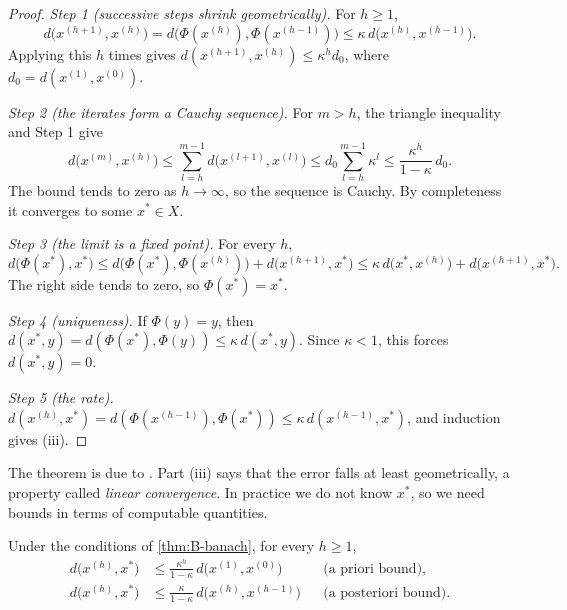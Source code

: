 \begin{proof}
\emph{Step 1 (successive steps shrink geometrically).} For $h \geq 1$,
\begin{equation*}
  d\big(x^{(h+1)}, x^{(h)}\big) = d\big(\Phi(x^{(h)}), \Phi(x^{(h-1)})\big) \leq \kappa\,d\big(x^{(h)},
  x^{(h-1)}\big).
\end{equation*}
Applying this $h$ times gives $d(x^{(h+1)}, x^{(h)}) \leq \kappa^h d_0$, where $d_0 = d(x^{(1)}, x^{(0)})$.

\emph{Step 2 (the iterates form a Cauchy sequence).} For $m > h$, the triangle inequality and Step 1 give
\begin{equation*}
  d\big(x^{(m)}, x^{(h)}\big) \leq \sum_{l=h}^{m-1}d\big(x^{(l+1)}, x^{(l)}\big) \leq d_0\sum_{l=h}^{m-1}
  \kappa^l \leq \frac{\kappa^h}{1 - \kappa}\,d_0.
\end{equation*}
The bound tends to zero as $h \to \infty$, so the sequence is Cauchy. By completeness it converges to some
$x^* \in X$.

\emph{Step 3 (the limit is a fixed point).} For every $h$,
\begin{equation*}
  d\big(\Phi(x^*), x^*\big) \leq d\big(\Phi(x^*), \Phi(x^{(h)})\big) + d\big(x^{(h+1)}, x^*\big)
  \leq \kappa\,d\big(x^*, x^{(h)}\big) + d\big(x^{(h+1)}, x^*\big).
\end{equation*}
The right side tends to zero, so $\Phi(x^*) = x^*$.

\emph{Step 4 (uniqueness).} If $\Phi(y) = y$, then $d(x^*, y) = d(\Phi(x^*), \Phi(y)) \leq \kappa\,d(x^*, y)$.
Since $\kappa < 1$, this forces $d(x^*, y) = 0$.

\emph{Step 5 (the rate).} $d(x^{(h)}, x^*) = d(\Phi(x^{(h-1)}), \Phi(x^*)) \leq \kappa\,d(x^{(h-1)}, x^*)$, and
induction gives (iii).
\end{proof}

The theorem is due to \citet{Banach1922}. Part (iii) says that the error falls at least geometrically, a
property called \emph{linear convergence}. In practice we do not know $x^*$, so we need bounds in terms of
computable quantities.

\begin{corollary}\label{cor:B-banach-bounds}
Under the conditions of \cref{thm:B-banach}, for every $h \geq 1$,
\begin{align}
  d\big(x^{(h)}, x^*\big) &\leq \frac{\kappa^h}{1 - \kappa}\,d\big(x^{(1)}, x^{(0)}\big)
  && \text{(a priori bound)}, \label{eq:B-apriori}\\
  d\big(x^{(h)}, x^*\big) &\leq \frac{\kappa}{1 - \kappa}\,d\big(x^{(h)}, x^{(h-1)}\big)
  && \text{(a posteriori bound)}. \label{eq:B-aposteriori}
\end{align}
\end{corollary}

